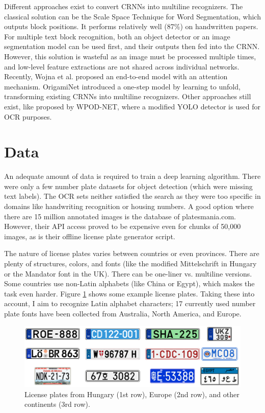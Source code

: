 Different approaches exist to convert CRNNs into multiline recognizers. The classical solution can be the Scale Space Technique for Word Segmentation\cite{ScaleWordSeg}, which outputs block positions. It performs relatively well (87\%) on handwritten papers. For multiple text block recognition, both an object detector or an image segmentation model can be used first, and their outputs then fed into the CRNN. However, this solution is wasteful as an image must be processed multiple times, and low-level feature extractions are not shared across individual networks. Recently, Wojna et al.\cite{Attention-basedExtract} proposed an end-to-end model with an attention mechanism. OrigamiNet\cite{OrigamiNet} introduced a one-step model by learning to unfold, transforming existing CRNNs into multiline recognizers. Other approaches still exist, like proposed by WPOD-NET\cite{WPOD-NET}, where a modified YOLO detector is used for OCR purposes.

\section{Data}

An adequate amount of data is required to train a deep learning algorithm. There were only a few number plate datasets for object detection (which were missing text labels). The OCR sets neither satisfied the search as they were too specific in domains like handwriting recognition or housing numbers. A good option where there are 15 million annotated images is the database of platesmania.com\cite{PlatesMania}. However, their API access proved to be expensive even for chunks of 50,000 images, as is their offline license plate generator script.

The nature of license plates varies between countries or even provinces. There are plenty of structures, colors, and fonts (like the modified Mittelschrift in Hungary or the Mandator font in the UK). There can be one-liner vs. multiline versions. Some countries use non-Latin alphabets (like China or Egypt), which makes the task even harder. Figure \ref{fig:plates} shows some example license plates. Taking these into account, I aim to recognize Latin alphabet characters; 17 currently used number plate fonts have been collected from Australia, North America, and Europe.

\begin{figure}[htb]
 \centerline{\includegraphics[width=1.0\columnwidth]{.//Figure/OCR/plates.png}}
 \caption{License plates from Hungary (1st row), Europe (2nd row), and other continents (3rd row).}
 \label{fig:plates}
\end{figure}

